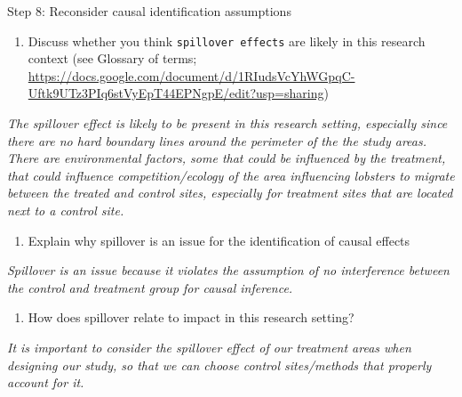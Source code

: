 \documentclass[
]{article}
\providecommand{\tightlist}{%
  \setlength{\itemsep}{0pt}\setlength{\parskip}{0pt}}
\begin{document}
Step 8: Reconsider causal identification assumptions

\begin{enumerate}
\def\labelenumi{\alph{enumi}.}
\tightlist
\item
  Discuss whether you think \texttt{spillover\ effects} are likely in
  this research context (see Glossary of terms;
  \url{https://docs.google.com/document/d/1RIudsVcYhWGpqC-Uftk9UTz3PIq6stVyEpT44EPNgpE/edit?usp=sharing})
\end{enumerate}

\emph{The spillover effect is likely to be present in this research
setting, especially since there are no hard boundary lines around the
perimeter of the the study areas. There are environmental factors, some
that could be influenced by the treatment, that could influence
competition/ecology of the area influencing lobsters to migrate between
the treated and control sites, especially for treatment sites that are
located next to a control site.}

\begin{enumerate}
\def\labelenumi{\alph{enumi}.}
\setcounter{enumi}{1}
\tightlist
\item
  Explain why spillover is an issue for the identification of causal
  effects
\end{enumerate}

\emph{Spillover is an issue because it violates the assumption of no
interference between the control and treatment group for causal
inference.}

\begin{enumerate}
\def\labelenumi{\alph{enumi}.}
\setcounter{enumi}{2}
\tightlist
\item
  How does spillover relate to impact in this research setting?
\end{enumerate}

\emph{It is important to consider the spillover effect of our treatment
areas when designing our study, so that we can choose control
sites/methods that properly account for it.}
\end{document}
